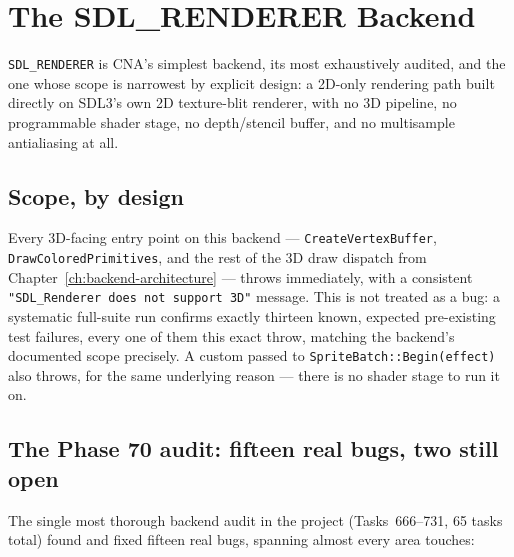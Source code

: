 \chapter{The SDL\_RENDERER Backend}
\label{ch:sdl-renderer}

\texttt{SDL\_RENDERER} is CNA's simplest backend, its most exhaustively audited, and the one
whose scope is narrowest by explicit design: a 2D-only rendering path built directly on
SDL3's own 2D texture-blit renderer, with no 3D pipeline, no programmable shader stage, no
depth/stencil buffer, and no multisample antialiasing at all.

\section{Scope, by design}

Every 3D-facing entry point on this backend --- \texttt{CreateVertexBuffer},
\texttt{DrawColoredPrimitives}, and the rest of the 3D draw dispatch from
Chapter~\ref{ch:backend-architecture} --- throws immediately, with a consistent
\texttt{"SDL\_Renderer does not support 3D"} message. This is not treated as a bug: a
systematic full-suite run confirms exactly thirteen known, expected pre-existing test
failures, every one of them this exact throw, matching the backend's documented scope
precisely. A custom  passed to \texttt{SpriteBatch::Begin(effect)} also
throws, for the same underlying reason --- there is no shader stage to run it on.

\section{The Phase 70 audit: fifteen real bugs, two still open}

The single most thorough backend audit in the project (Tasks~666--731, 65 tasks total)
found and fixed fifteen real bugs, spanning almost every area 
touches:

